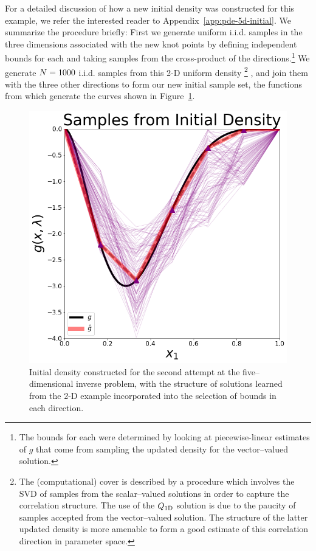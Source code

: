 For a detailed discussion of how a new initial density was constructed for this example, we refer the interested reader to Appendix~\ref{app:pde-5d-initial}.
We summarize the procedure briefly:
First we generate uniform i.i.d. samples in the three dimensions associated with the new knot points by defining independent bounds for each and taking samples from the cross-product of the directions.\footnote{
The bounds for each were determined by looking at piecewise-linear estimates of $g$ that come from sampling the updated density for the vector--valued solution.
}
We generate $N=1000$ i.i.d. samples from this 2-D uniform density
\footnote{
The (computational) cover is described by a procedure which involves the SVD of samples from the scalar--valued solutions in order to capture the correlation structure.
The use of the $Q_\text{1D}$ solution is due to the paucity of samples accepted from the vector--valued solution.
The structure of the latter updated density is more amenable to form a good estimate of this correlation direction in parameter space.
}
, and join them with the three other directions to form our new initial sample set, the functions from which generate the curves shown in Figure~\ref{fig:pde-highd-alt-initial-5d}.

\begin{figure}
\centering
  \includegraphics[width=0.675\linewidth]{figures/pde-highd/pde-highd_init_D5-alt}
\caption{
Initial density constructed for the second attempt at the five--dimensional inverse problem, with the structure of solutions learned from the 2-D example incorporated into the selection of bounds in each direction.
}
\label{fig:pde-highd-alt-initial-5d}
\end{figure}

